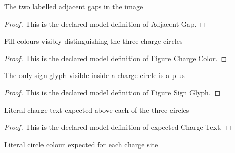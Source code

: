 \begin{definition}
  \label{def:physics:phyx-mini-0900:phyxminiproblems-problemphyxmini0900-adjacentgap}
  The two labelled adjacent gaps in the image
\end{definition}
\begin{proof}
  This is the declared model definition of Adjacent Gap.
\end{proof}
\begin{definition}
  \label{def:physics:phyx-mini-0900:phyxminiproblems-problemphyxmini0900-figurechargecolor}
  Fill colours visibly distinguishing the three charge circles
\end{definition}
\begin{proof}
  This is the declared model definition of Figure Charge Color.
\end{proof}
\begin{definition}
  \label{def:physics:phyx-mini-0900:phyxminiproblems-problemphyxmini0900-figuresignglyph}
  The only sign glyph visible inside a charge circle is a plus
\end{definition}
\begin{proof}
  This is the declared model definition of Figure Sign Glyph.
\end{proof}
\begin{definition}
  \label{def:physics:phyx-mini-0900:phyxminiproblems-problemphyxmini0900-expectedchargetext}
  Literal charge text expected above each of the three circles
\end{definition}
\begin{proof}
  This is the declared model definition of expected Charge Text.
\end{proof}
\begin{definition}
  \label{def:physics:phyx-mini-0900:phyxminiproblems-problemphyxmini0900-expectedchargecolor}
  Literal circle colour expected for each charge site
\end{definition}
